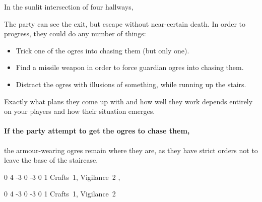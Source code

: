 \begin{multicols}{2}

\begin{boxtext}

	In the sunlit intersection of four hallways,
	\iftoggle{hardcore}%
		{four ogres sit playing a game of dice.  Two are clad in black leather armour, with a massive sword by their side.
		Another sucks on a horse's uncooked head, while the third goes for a piss behind the staircase.}%
		{three ogres sit playing dice.
		Two are clad in black, leather armour, apparently pieced together from multiple suits.
		The third sits watching them play some dice game.}%

\end{boxtext}

The party can see the exit, but escape without near-certain death.
In order to progress, they could do any number of things:

\begin{itemize}

	\item{Trick one of the ogres into chasing them (but only one).}
	\item{Find a missile weapon in order to force guardian ogres into chasing them.}
	\item{Distract the ogres with illusions of something, while running up the stairs.}

\end{itemize}

Exactly what plans they come up with and how well they work depends entirely on your players and how their situation emerges.

\paragraph{If the party attempt to get the ogres to chase them,}
the armour-wearing ogres remain where they are, as they have strict orders not to leave the base of the staircase.


{0}%
{4}%
{{-3}%
{0}%
{-3}}%
{0}%
{1}%
{Crafts~1, Vigilance~2}%
{\greatsword, \partialleather}%
{}


\label{chasingogre}

{0}%
{4}%
{{-3}%
{0}%
{-3}}%
{0}%
{1}%
{Crafts~1, Vigilance~2}%
{\greatclub}%
{}


\end{multicols}
